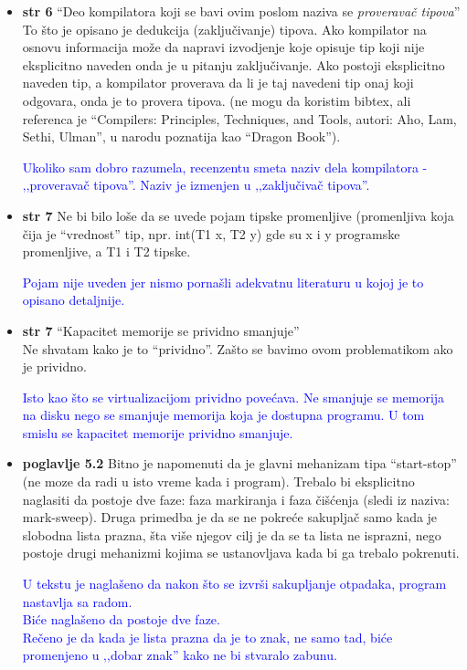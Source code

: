 \documentclass[a4paper]{report}
\newcommand{\odgovor}[1]{\textcolor{blue}{#1}}
\begin{document}
\begin{itemize}
\item \textbf{str 6} ``Deo kompilatora koji se bavi ovim poslom naziva se \textit{proveravač tipova}'' \\ To što je opisano je dedukcija (zaključivanje) tipova. Ako kompilator na osnovu informacija može da napravi izvodjenje koje opisuje tip koji nije eksplicitno naveden onda je u pitanju zaključivanje. Ako postoji eksplicitno naveden tip, a kompilator proverava da li je taj navedeni tip onaj koji odgovara, onda je to provera tipova. (ne mogu da koristim bibtex, ali referenca je ``Compilers: Principles, Techniques, and Tools, autori: Aho, Lam, Sethi, Ulman'', u narodu poznatija kao ``Dragon Book'').

\odgovor{Ukoliko sam dobro razumela, recenzentu smeta naziv dela kompilatora - ‚‚proveravač tipova''. Naziv je izmenjen u ‚‚zaključivač tipova''.}

\item \textbf{str 7} Ne bi bilo loše da se uvede pojam tipske promenljive (promenljiva koja čija je ``vrednost'' tip, npr. int(T1 x, T2 y) gde su x i y programske promenljive, a T1 i T2 tipske.

\odgovor{Pojam nije uveden jer nismo pornašli adekvatnu literaturu u kojoj je to opisano detaljnije.}

\item \textbf{str 7} ``Kapacitet memorije se prividno smanjuje'' \\ Ne shvatam kako je to ``prividno''. Zašto se bavimo ovom problematikom ako je prividno. 

\odgovor{Isto kao što se virtualizacijom prividno povećava. Ne smanjuje se memorija na disku nego se smanjuje memorija koja je dostupna programu. U tom smislu se kapacitet memorije prividno smanjuje.}

\item \textbf{poglavlje 5.2} Bitno je napomenuti da je glavni mehanizam tipa ``start-stop'' (ne moze da radi u isto vreme kada i program). Trebalo bi eksplicitno naglasiti da postoje dve faze: faza markiranja i faza čišćenja (sledi iz naziva: mark-sweep). Druga primedba je da se ne pokreće sakupljač samo kada je slobodna lista prazna, šta više njegov cilj je da se ta lista ne isprazni, nego postoje drugi mehanizmi kojima se ustanovljava kada bi ga trebalo pokrenuti.

\odgovor{U tekstu je naglašeno da nakon što se izvrši sakupljanje otpadaka, program nastavlja sa radom.\\
Biće naglašeno da postoje dve faze. \\
Rečeno je da kada je lista prazna da je to znak, ne samo tad, biće promenjeno u ‚‚dobar znak'' kako ne bi stvaralo zabunu.}


\end{itemize}
\end{document}
